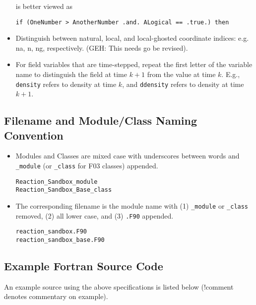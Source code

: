 \begin{itemize}
is better viewed as

{\tt if (OneNumber > AnotherNumber .and. ALogical == .true.) then}

\item Distinguish between natural, local, and local-ghosted coordinate indices: e.g. na, n, ng, respectively. (GEH: This needs go be revised).

\item For field variables that are time-stepped, repeat the first letter of the variable name to 
distinguish the field at time $k+1$ from the value at time $k$. E.g., {\tt density} refers to 
density at time $k$, and {\tt ddensity} refers to density at time $k+1$.
\end{itemize}

\subsection*{Filename and Module/Class Naming Convention}

\begin{itemize}
\item Modules and Classes are mixed case with underscores between words and {\tt \_module} (or {\tt \_class} for F03 classes) appended.

\begin{mdframed}
\begin{Verbatim}
Reaction_Sandbox_module
Reaction_Sandbox_Base_class
\end{Verbatim}
\end{mdframed}

\item The corresponding filename is the module name with (1) {\tt \_module} or {\tt \_class} removed, (2) all lower case, and (3) {\tt .F90} appended.

\begin{mdframed}
\begin{Verbatim}
reaction_sandbox.F90
reaction_sandbox_base.F90
\end{Verbatim}
\end{mdframed}

\end{itemize}

\subsection*{Example Fortran Source Code}

An example source using the above specifications is listed below (!comment denotes  commentary on example).

